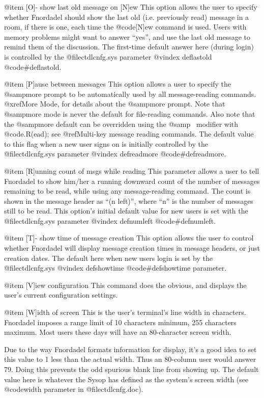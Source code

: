 @item [O]- show last old message on [N]ew
This option allows the user to specify whether
Fnordadel should show the last old (i.e. previously
read) message in a room, if there is one, each time
the @code{[N]ew} command is used.  Users with memory problems might
want to answer ``yes'', and use the last old message to remind
them of the discussion.  The first-time default answer
here (during login) is controlled by the @file{ctdlcnfg.sys} parameter
@vindex deflastold
@code{#deflastold}.

@item [P]ause between messages
This option allows a user to specify the @samp{more}
prompt to be automatically used by all message-reading
commands.  @xref{More Mode}, for details about the @samp{more}
prompt.  Note that @samp{more} mode is never the default for file-reading
commands.  Also note that the @samp{more} default can be
overridden using the @samp{~} modifier with @code{.R(ead)}; see
@ref{Multi-key message reading commands}.
The default value to this flag when a new user
signs on is initially
controlled by the @file{ctdlcnfg.sys} parameter
@vindex defreadmore
@code{#defreadmore}.

@item [R]unning count of msgs while reading
This parameter allows a user to tell Fnordadel to
show him/her a running downward count of the number of messages
remaining to be read, while using any message-reading command.
The count is shown in the message header as ``(n left)'', where
``n'' is the number of messages still to be read.  This option's
initial default value for new users is set with the @file{ctdlcnfg.sys}
parameter
@vindex defnumleft
@code{#defnumleft}.

@item [T]- show time of message creation
This option allows the user to control whether
Fnordadel will display message creation times in
message headers, or just creation dates.  The default
here when new users login is set by the @file{ctdlcnfg.sys}
@vindex defshowtime
@code{#defshowtime} parameter.

@item [V]iew configuration
This command does the obvious, and displays the user's
current configuration settings.

@item [W]idth of screen
This is the user's terminal's line width in characters.
Fnordadel imposes a range limit of 10 characters minimum,
255 characters maximum.  Most users these days will have an
80-character screen width.

Due to the way Fnordadel formats
information for display, it's a good idea to set this value to
1 less than the actual width.  Thus an 80-column user would
answer 79.  Doing this prevents the odd spurious blank line
from showing up.  The default value here is whatever the Sysop
has defined as the system's screen width (see @code{width} parameter
in @file{ctdlcnfg.doc}).

